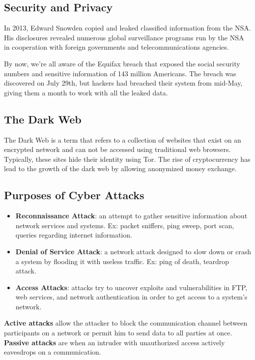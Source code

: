 \documentclass{math}
\begin{document}
\subsection*{Security and Privacy}
In 2013, Edward Snowden copied and leaked classified information from the NSA.
His disclosures revealed numerous global surveillance programs run by the NSA in
cooperation with foreign governments and telecommunications agencies. \par
By now, we're all aware of the Equifax breach that exposed the social security
numbers and sensitive information of 143 million Americans. The breach was
discovered on July 29th, but hackers had breached their system from mid-May,
giving them a month to work with all the leaked data.

\subsection*{The Dark Web}
The Dark Web is a term that refers to a collection of websites that exist
on an encrypted network and can not be accessed using traditional web browsers.
Typically, these sites hide their identity using Tor. The rise of
cryptocurrency has lead to the growth of the dark web by allowing anonymized
money exchange.

\subsection*{Purposes of Cyber Attacks}
\begin{itemize}
  \item \textbf{Reconnaissance Attack}: an attempt to gather sensitive
    information about network services and systems. Ex: packet sniffers, ping
    sweep, port scan, queries regarding internet information.
  \item \textbf{Denial of Service Attack}: a network attack designed to slow
    down or crash a system by flooding it with useless traffic. Ex: ping of
    death, teardrop attack.
  \item \textbf{Access Attacks}: attacks try to uncover exploits and
    vulnerabilities in FTP, web services, and network authentication in order
    to get access to a system's network.
\end{itemize}
\textbf{Active attacks} allow the attacker to block the communication channel
between participants on a network or permit him to send data to all parties at
once. \textbf{Passive attacks} are when an intruder with unauthorized access
actively eavesdrops on a communication.
\end{document}
